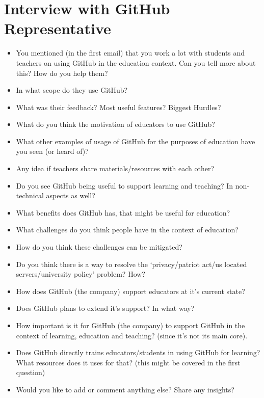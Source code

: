 \section{Interview with GitHub Representative}
\begin{itemize}
    \item You mentioned (in the first email) that you work a lot with students and teachers on using GitHub in the education context. Can you tell more about this? How do you help them?
    \item In what scope do they use GitHub?
    \item What was their feedback? Most useful features? Biggest Hurdles?
    \item What do you think the motivation of educators to use GitHub?
    \item What other examples of usage of GitHub for the purposes of education have you seen (or heard of)?
    \item Any idea if teachers share materials/resources with each other?
    \item Do you see GitHub being useful to support learning and teaching? In non-technical aspects as well?
    \item What benefits does GitHub has, that might be useful for education?
    \item What challenges do you think people have in the context of education?
    \item How do you think these challenges can be mitigated?
    \item Do you think there is a way to resolve the `privacy/patriot act/us located servers/university policy' problem? How?
    \item How does GitHub (the company) support educators at it's current state?
    \item Does GitHub plans to extend it's support? In what way?
    \item How important is it for GitHub (the company) to support GitHub in the context of learning, education and teaching? (since it's not its main core).
    \item Does GitHub directly trains educators/students in using GitHub for learning? What resources does it uses for that? (this might be covered in the first question)
    \item Would you like to add or comment anything else? Share any insights?
\end{itemize}

\startappendix
